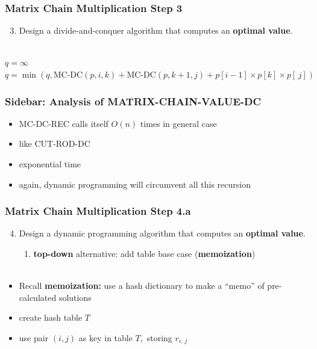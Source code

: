 \documentclass[10pt,aspectratio=169]{beamer}
\newcommand{\stanza}{ \\~\ }
\begin{document}
\begin{frame} \frametitle{Matrix Chain Multiplication Step 3}
  \begin{enumerate}
    \setcounter{enumi}{2}
    \item Design a divide-and-conquer algorithm that computes an \textbf{optimal value}.
    \stanza
  \end{enumerate}

  {\scriptsize
  \begin{algorithmic}[1]
    \State {}
    \EndFunction
      \State {}
    \EndIf
    \State $q = \infty$
      \State $q = \min(q, \text{MC-DC}(p, i, k) + \text{MC-DC}(p, k+1, j) + p[i-1] \times p[k] \times p[\, j])$
    \EndFor
    \State {}
    \EndFunction
  \end{algorithmic}
  }
\end{frame}

\begin{frame} \frametitle{Sidebar: Analysis of MATRIX-CHAIN-VALUE-DC}
\begin{itemize}
  \item MC-DC-REC calls itself $O(n)$ times in general case
  \item like CUT-ROD-DC
  \item exponential time
  \item again, dynamic programming will circumvent all this recursion
\end{itemize}
\end{frame}

\begin{frame} \frametitle{Matrix Chain Multiplication Step 4.a}
  \begin{enumerate}
    \setcounter{enumi}{3}
    \item Design a dynamic programming algorithm that computes an \textbf{optimal value}.
    \begin{enumerate}
      \item \textbf{top-down} alternative: add table base case (\textbf{memoization})
      \stanza
    \end{enumerate}
\end{enumerate}

\begin{itemize}
  \item Recall \textbf{memoization:} use a hash dictionary to make a ``memo'' of pre-calculated solutions
  \item create hash table $T$
  \item use pair $(i, j)$ as key in table $T,$ storing $r_{i,\, j}$
\end{itemize}
\end{frame}
\end{document}
